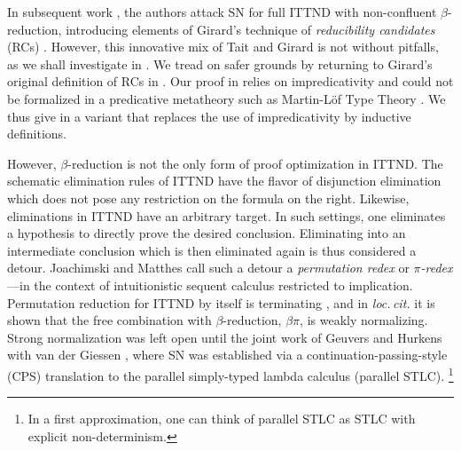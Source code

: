 \documentclass[a4paper,USenglish,cleveref, autoref, thm-restate]{lipics-v2021}
\newcommand{\loccit}{\emph{loc.\,cit.}\xspace}
\begin{document}
In subsequent work \cite{geuversHurkens:types17}, the authors attack
SN for full ITTND with non-confluent $\beta$-reduction, introducing
elements of Girard's technique of \emph{reducibility candidates} (RCs)
\cite{girard:thesis,girardLafontTaylor:proofsAndTypes}.  However, this
innovative mix of Tait and Girard is not without pitfalls, as we shall
investigate in .  We tread on safer grounds by
returning to Girard's original definition of RCs in .
Our proof in  relies on impredicativity
and could not be formalized in a predicative metatheory such as
Martin-Löf Type Theory \cite{MartinLoef84}.  We thus give in
 a variant that
replaces the use of impredicativity by inductive definitions.

However, $\beta$-reduction is not the only form of proof optimization in ITTND.
The schematic elimination rules of ITTND have the flavor of
disjunction elimination which does not pose any
restriction on the formula on the right.  Likewise, eliminations in
ITTND have an arbitrary target.  In such settings, one eliminates a hypothesis to directly prove the desired conclusion.
Eliminating into an intermediate conclusion which is then eliminated
again is thus considered a detour.
Joachimski and Matthes \cite{joachimskiMatthes:rta00}
call such a detour a \emph{permutation redex} or
\emph{$\pi$-redex}\footnotemark{}
---in the context of intuitionistic sequent calculus restricted to implication.
%
Permutation reduction for ITTND by itself is terminating
\cite{geuversHurkens:types17}, and in \loccit it is shown that the
free combination with $\beta$-reduction, $\beta\pi$, is weakly
normalizing.  Strong normalization was left open until the joint work
of Geuvers and Hurkens
with van der Giessen \cite{geuversGiessenHurkens:fundinf19}, where SN
was established via a continuation-passing-style (CPS) translation to
the parallel simply-typed lambda calculus (parallel STLC).%
\footnote{In a first approximation, one can think of parallel STLC as STLC with explicit non-determinism.}
\end{document}
